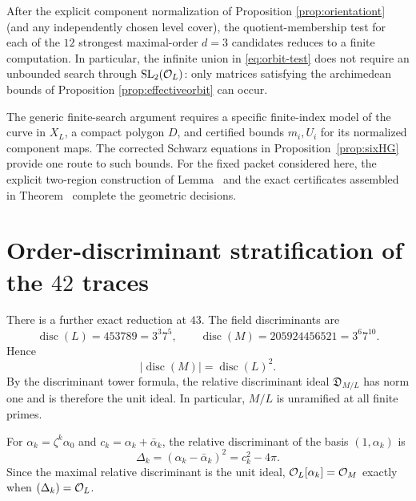 \begin{corollary}\label{cor:finitegeometric}
After the explicit component normalization of Proposition \ref{prop:orientationt} (and any independently chosen level cover), the quotient-membership test for each of the $12$ strongest maximal-order
$d=3$ candidates reduces to a finite computation.  In particular, the infinite union in
\eqref{eq:orbit-test} does not require an unbounded search through
$\mathrm{SL}_2(\mathcal O_L)$: only matrices satisfying the archimedean bounds of
Proposition \ref{prop:effectiveorbit} can occur.
\end{corollary}

The generic finite-search argument requires a specific finite-index model
of the curve in $X_L$, a compact polygon $D$, and certified bounds
$m_i,U_i$ for its normalized component maps. The corrected Schwarz equations
in Proposition~\ref{prop:sixHG} provide one route to such bounds.
For the fixed packet considered here, the explicit two-region construction
of Lemma~ and the exact certificates assembled in
Theorem~ complete the geometric decisions.


\section{Order-discriminant stratification of the $42$ traces}\label{app:orders}
There is a further exact reduction at $43$. The field discriminants are
\[
 \operatorname{disc}(L)=453789=3^3 7^5,
 \qquad
 \operatorname{disc}(M)=205924456521=3^6 7^{10}.
\]
Hence
\[
 |\operatorname{disc}(M)|=\operatorname{disc}(L)^2.
\]
By the discriminant tower formula, the relative discriminant ideal $\mathfrak D_{M/L}$ has norm one and is therefore the unit ideal. In particular, $M/L$ is unramified at all finite primes.

For $\alpha_k=\zeta^k\alpha_0$ and $c_k=\alpha_k+\bar\alpha_k$, the relative discriminant of the basis $(1,\alpha_k)$ is
\begin{equation}\label{eq:Deltak}
 \Delta_k=(\alpha_k-\bar\alpha_k)^2=c_k^2-4\pi.
\end{equation}
Since the maximal relative discriminant is the unit ideal, $\mathcal O_L[\alpha_k]=\mathcal O_M$ exactly when $(\Delta_k)=\mathcal O_L$.

